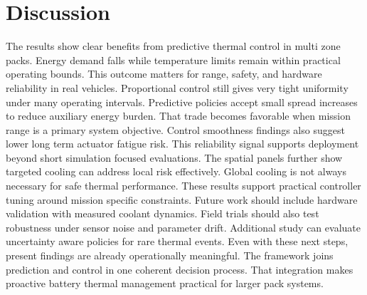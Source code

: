 \documentclass{article}
\begin{document}
\section{Discussion}

The results show clear benefits from predictive thermal control in multi zone packs.
Energy demand falls while temperature limits remain within practical operating bounds.
This outcome matters for range, safety, and hardware reliability in real vehicles.
Proportional control still gives very tight uniformity under many operating intervals.
Predictive policies accept small spread increases to reduce auxiliary energy burden.
That trade becomes favorable when mission range is a primary system objective.
Control smoothness findings also suggest lower long term actuator fatigue risk.
This reliability signal supports deployment beyond short simulation focused evaluations.
The spatial panels further show targeted cooling can address local risk effectively.
Global cooling is not always necessary for safe thermal performance.
These results support practical controller tuning around mission specific constraints.
Future work should include hardware validation with measured coolant dynamics.
Field trials should also test robustness under sensor noise and parameter drift.
Additional study can evaluate uncertainty aware policies for rare thermal events.
Even with these next steps, present findings are already operationally meaningful.
The framework joins prediction and control in one coherent decision process.
That integration makes proactive battery thermal management practical for larger pack systems.
\end{document}
